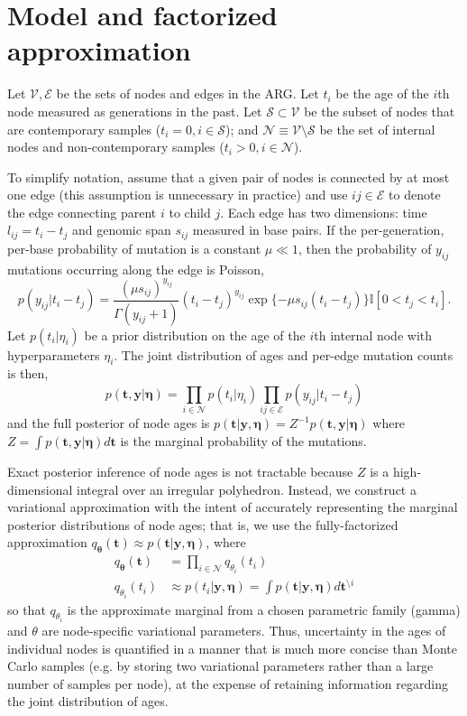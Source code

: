 \documentclass{article}
\begin{document}
\section{Model and factorized approximation}

Let $\mathcal{V}, \mathcal{E}$ be the sets of nodes and edges in the ARG. Let $t_i$ be the age of the $i$th node measured as generations in the past. Let $\mathcal{S} \subset \mathcal{V}$ be the subset of nodes that are contemporary samples ($t_i = 0, i \in \mathcal{S}$); and $\mathcal{N} \equiv \mathcal{V} \setminus \mathcal{S}$ be the set of internal nodes and non-contemporary samples ($t_i > 0, i \in \mathcal{N}$). 

To simplify notation, assume that a given pair of nodes is connected by at most one edge (this assumption is unnecessary in practice) and use $ij \in \mathcal{E}$ to denote the edge connecting parent $i$ to child $j$. Each edge has two dimensions: time $l_{ij} = t_i - t_j$ and genomic span $s_{ij}$ measured in base pairs. If the per-generation, per-base probability of mutation is a constant $\mu \ll 1$, then the probability of $y_{ij}$ mutations occurring along the edge is Poisson, \[
p(y_{ij} | t_{i} - t_{j}) = \frac{(\mu s_{ij})^{y_{ij}}}{\Gamma(y_{ij} + 1)} (t_i - t_j)^{y_{ij}} \exp\{-\mu s_{ij} (t_i - t_j)\} \mathbb{I}[0 < t_j < t_i]. 
\]
Let $p(t_i | \eta_i)$ be a prior distribution on the age of the $i$th internal node with hyperparameters $\eta_i$. The joint distribution of ages and per-edge mutation counts is then,
\[
p(\bm t, \bm y | \bm \eta) = \prod_{i \in \mathcal{N}} p(t_i | \eta_i) \prod_{ij \in \mathcal{E}} p(y_{ij} | t_i - t_j)
\]
and the full posterior of node ages is $p(\bm t | \bm y, \bm \eta) = Z^{-1} p(\bm t, \bm y | \bm \eta)$ where $Z = \int p(\bm t, \bm y | \bm \eta) d\bm t$ is the marginal probability of the mutations.

Exact posterior inference of node ages is not tractable because $Z$ is a high-dimensional integral over an irregular polyhedron. Instead, we construct a variational approximation with the intent of accurately representing the marginal posterior distributions of node ages; that is, we use the fully-factorized approximation $q_{\bm \theta}(\bm t) \approx p(\bm t | \bm y, \bm \eta)$, where
\[
\begin{aligned}
q_{\bm \theta}(\bm t) & = \prod_{i \in \mathcal{N}} q_{\theta_i}(t_i) \\
q_{\theta_i}(t_i) & \approx p(t_i | \bm y, \bm \eta) = \int p(\bm t | \bm y, \bm \eta) d\bm t^{\setminus i}
\end{aligned}
\]
so that $q_{\theta_i}$ is the approximate marginal from a chosen parametric family (gamma) and $\theta$ are node-specific variational parameters. Thus, uncertainty in the ages of individual nodes is quantified in a manner that is much more concise than Monte Carlo samples (e.g. by storing two variational parameters rather than a large number of samples per node), at the expense of retaining information regarding the joint distribution of ages.
\end{document}
